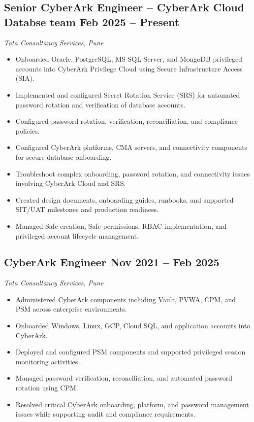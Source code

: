 \documentclass[a4paper,11pt]{article}
\begin{document}
\subsection*{Senior CyberArk Engineer -- CyberArk Cloud Databse team \hfill Feb 2025 -- Present}
\textit{Tata Consultancy Services, Pune}

\begin{itemize}
\item Onboarded Oracle, PostgreSQL, MS SQL Server, and MongoDB privileged accounts into CyberArk Privilege Cloud using Secure Infrastructure Access (SIA).
\item Implemented and configured Secret Rotation Service (SRS) for automated password rotation and verification of database accounts.
\item Configured password rotation, verification, reconciliation, and compliance policies.
\item Configured CyberArk platforms, CMA servers, and connectivity components for secure database onboarding.
\item Troubleshoot complex onboarding, password rotation, and connectivity issues involving CyberArk Cloud and SRS.
\item Created design documents, onboarding guides, runbooks, and supported SIT/UAT milestones and production readiness.
\item Managed Safe creation, Safe permissions, RBAC implementation, and privileged account lifecycle management.
\end{itemize}
\subsection*{CyberArk Engineer  \hfill Nov 2021 -- Feb 2025}
\textit{Tata Consultancy Services, Pune}

\begin{itemize}
\item Administered CyberArk components including Vault, PVWA, CPM, and PSM across enterprise environments.
\item Onboarded Windows, Linux, GCP, Cloud SQL, and application accounts into CyberArk.
\item Deployed and configured PSM components and supported privileged session monitoring activities.
\item Managed password verification, reconciliation, and automated password rotation using CPM.
\item Resolved critical CyberArk onboarding, platform, and password management issues while supporting audit and compliance requirements.
\end{itemize}
\end{document}
